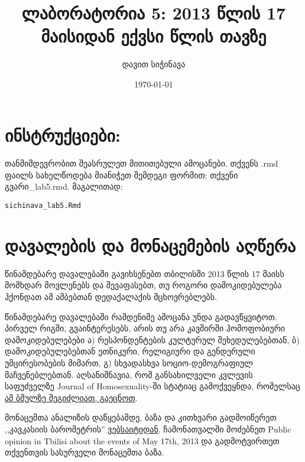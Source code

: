 \documentclass{article}\usepackage[]{graphicx}\usepackage[]{color}
\title{ლაბორატორია 5: 2013 წლის 17 მაისიდან ექვსი წლის თავზე}
\author{დავით სიჭინავა}
\date{\today}
\makeatletter
\newcommand{\hlstd}[1]{\textcolor[rgb]{0.345,0.345,0.345}{#1}}%
\newenvironment{kframe}{%
 \def\at@end@of@kframe{}%
 \ifinner\ifhmode%
  \def\at@end@of@kframe{\end{minipage}}%
  \begin{minipage}{\columnwidth}%
 \fi\fi%
 \def\FrameCommand##1{\hskip\@totalleftmargin \hskip-\fboxsep
 \colorbox{shadecolor}{##1}\hskip-\fboxsep
     \hskip-\linewidth \hskip-\@totalleftmargin \hskip\columnwidth}%
 \MakeFramed {\advance\hsize-\width
   \@totalleftmargin\z@ \linewidth\hsize
   \@setminipage}}%
 {\par\unskip\endMakeFramed%
 \at@end@of@kframe}
\newenvironment{knitrout}{}{} %
\makeatother
\begin{document}
\maketitle

\section*{ინსტრუქციები:}

\paragraph{}
თანმიმდევრობით შეასრულეთ მითითებული ამოცანები. თქვენს .rmd ფაილს სახელწოდება მიანიჭეთ შემდეგი ფორმით: თქვენი გვარი\_lab5.rmd. მაგალითად:

\begin{knitrout}
\color{fgcolor}\begin{kframe}
\begin{alltt}
\hlstd{sichinava_lab5.Rmd}
\end{alltt}
\end{kframe}
\end{knitrout}

\section*{დავალების და მონაცემების აღწერა}

წინამდებარე დავალებაში გავიხსენებთ თბილისში 2013 წლის 17 მაისს მომხდარ მოვლენებს და შევაფასებთ, თუ როგორი დამოკიდებულება ჰქონდათ ამ ამბებთან დედაქალაქის მცხოვრებლებს. 


წინამდებარე დავალებაში რამდენიმე ამოცანა უნდა გადავწყვიტოთ. პირველ რიგში, გვაინტერესებს, არის თუ არა კავშირში ჰომოფობიური დამოკიდებულებები ა) რესპონდენტების კულტურულ შეხედულებებთან, ბ) დამოკიდებულებებთან ეთნიკური, რელიგიური და გენდერული უმცირესობების მიმართ, გ) სხვადასხვა სოციო-დემოგრაფიულ მაჩვენებლებთან. აღსანიშნავია, რომ განსახილველი კვლევის საფუძველზე Journal of Homosexuality-ში სტატიაც გამოქვეყნდა, რომელსაც \href{https://www.dropbox.com/s/spwwiokdub2a4oi/mestvirishvili2016.pdf?dl=0}{ამ ბმულზე შეგიძლიათ, გაეცნოთ}.

მონაცემთა ანალიზის დაწყებამდე, ბაზა და კითხვარი გადმოიწერეთ ,,კავკასიის ბარომეტრის'' \href{http://caucasusbarometer.org/en/downloads/}{ვებსაიტიდან}. ჩამონათვალში მოძებნეთ Public opinion in Tbilisi about the events of May 17th, 2013 და გადმოტვირთეთ თქვენთვის სასურველი მონაცემთა ბაზა.
\end{document}
